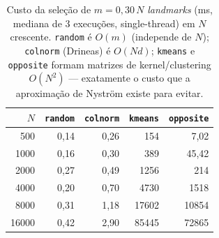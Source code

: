 \begin{table}[ht]
  \centering
  \caption{Custo da seleção de $m=0{,}30\,N$ \emph{landmarks} (ms, mediana de 3 execuções, single-thread) em $N$ crescente. \texttt{random} é $O(m)$ (independe de $N$); \texttt{colnorm} (Drineas) é $O(N d)$; \texttt{kmeans} e \texttt{opposite} formam matrizes de kernel/clustering $O(N^2)$ --- exatamente o custo que a aproximação de Nyström existe para evitar.}
  \label{tab:app_selection_cost}
  \begin{tabular}{rrrrr}
    \toprule
    $N$ & \texttt{random} & \texttt{colnorm} & \texttt{kmeans} & \texttt{opposite} \\
    \midrule
    500 & 0,14 & 0,26 & 154 & 7,02 \\
    1000 & 0,16 & 0,30 & 389 & 45,42 \\
    2000 & 0,27 & 0,49 & 1256 & 214 \\
    4000 & 0,20 & 0,70 & 4730 & 1518 \\
    8000 & 0,31 & 1,18 & 17602 & 10854 \\
    16000 & 0,42 & 2,90 & 85445 & 72865 \\
    \bottomrule
  \end{tabular}
\end{table}
